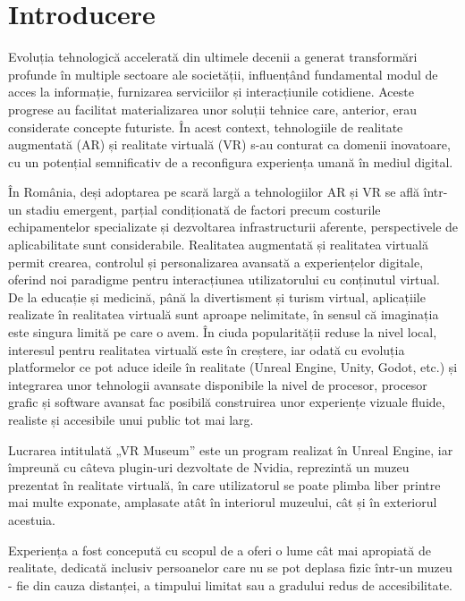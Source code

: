 \chapter{Introducere}
\label{cap:cap1}

Evoluția tehnologică accelerată din ultimele decenii a generat transformări profunde în multiple sectoare ale societății, influențând fundamental modul de acces la informație, furnizarea serviciilor și interacțiunile cotidiene. Aceste progrese au facilitat materializarea unor soluții tehnice care, anterior, erau considerate concepte futuriste. În acest context, tehnologiile de realitate augmentată (AR) și realitate virtuală (VR) s-au conturat ca domenii inovatoare, cu un potențial semnificativ de a reconfigura experiența umană în mediul digital.

În România, deși adoptarea pe scară largă a tehnologiilor AR și VR se află într-un stadiu emergent, parțial condiționată de factori precum costurile echipamentelor specializate și dezvoltarea infrastructurii aferente, perspectivele de aplicabilitate sunt considerabile. Realitatea augmentată și realitatea virtuală permit crearea, controlul și personalizarea avansată a experiențelor digitale, oferind noi paradigme pentru interacțiunea utilizatorului cu conținutul virtual. De la educație și medicină, până la divertisment și turism virtual, aplicațiile realizate în realitatea virtuală sunt aproape nelimitate, în sensul că imaginația este singura limită pe care o avem. În ciuda popularității reduse la nivel local, interesul pentru realitatea virtuală este în creștere, iar odată cu evoluția platformelor ce pot aduce ideile în realitate (Unreal Engine, Unity, Godot, etc.) și integrarea unor tehnologii avansate disponibile la nivel de procesor, procesor grafic și software avansat fac posibilă construirea unor experiențe vizuale fluide, realiste și accesibile unui public tot mai larg.

Lucrarea intitulată „VR Museum” este un program realizat în Unreal Engine, iar împreună cu câteva plugin-uri dezvoltate de Nvidia, reprezintă un muzeu prezentat în realitate virtuală, în care utilizatorul se poate plimba liber printre mai multe exponate, amplasate atât în interiorul muzeului, cât și în exteriorul acestuia. 

Experiența a fost concepută cu scopul de a oferi o lume cât mai apropiată de realitate, dedicată inclusiv persoanelor care nu se pot deplasa fizic într-un muzeu - fie din cauza distanței, a timpului limitat sau a gradului redus de accesibilitate.

